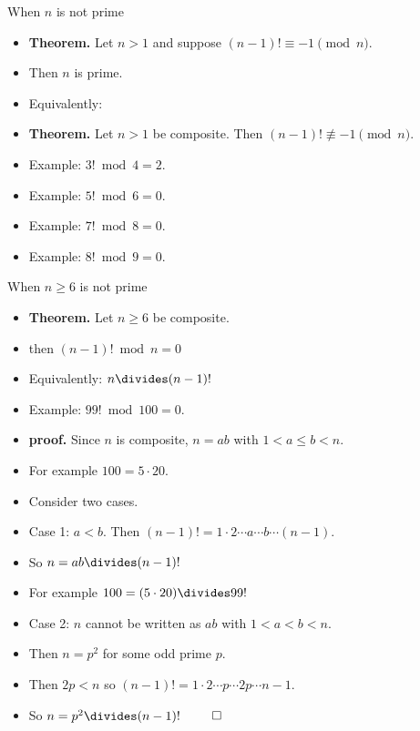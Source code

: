 \documentclass[handout]{beamer}
\begin{document}
\begin{frame}{When $n$ is not prime}

\begin{itemize}
  \item \textbf{Theorem.} Let $n>1$ and suppose $(n-1)! \equiv -1 \pmod n$.
  \item Then $n$ is prime.
  \item Equivalently:
  \item \textbf{Theorem.} Let $n>1$ be composite. Then $(n-1)! \not\equiv -1 \pmod n$.
  \item Example: $3! \bmod 4 = 2$.
  \item Example: $5! \bmod 6 = 0$.
  \item Example: $7! \bmod 8 = 0$.
  \item Example: $8! \bmod 9 = 0$.
\end{itemize}

\end{frame}

\begin{frame}{When $n\geq 6$ is not prime}

\begin{itemize}
  \item \textbf{Theorem.} Let $n \geq 6$ be composite.
  \item then $(n-1)! \bmod n = 0$
  \item Equivalently: $n\divides (n-1)!$
  \item Example: $99! \bmod 100 = 0$.
  \item \textbf{proof.} Since $n$ is composite, $n=ab$ with $1< a \leq b < n$.
  \item For example $100 = 5\cdot 20$.
  \item Consider two cases.
  \item Case 1: $a<b$. Then $(n-1)! = 1\cdot 2 \cdots a \cdots b \cdots (n-1)$.
  \item So $n=ab \divides (n-1)!$
  \item For example $100 = (5\cdot 20) \divides 99!$
  \item Case 2: $n$ cannot be written as $ab$ with $1<a<b<n$.
  \item Then $n=p^2$ for some odd prime $p$.
  \item Then $2p < n$ so $(n-1)! = 1\cdot 2 \cdots p \cdots 2p \cdots n-1$.
  \item So $n=p^2 \divides (n-1)!$ $\qed$
\end{itemize}

\end{frame}
\end{document}
